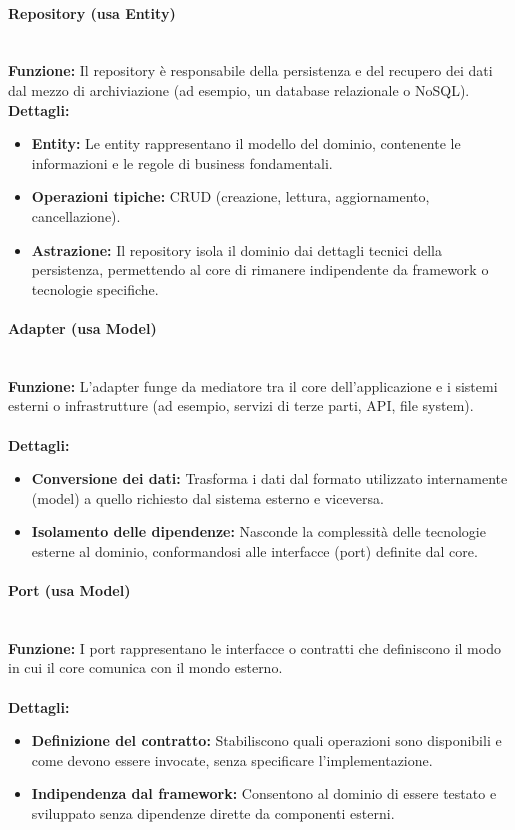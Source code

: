 \paragraph{Repository (usa Entity)} 
\mbox{}\\
\textbf{Funzione:} Il repository è responsabile della persistenza e del recupero dei dati dal mezzo di archiviazione (ad esempio, un database relazionale o NoSQL). 
\mbox{}\\
\textbf{Dettagli:}
\begin{itemize}
  \item \textbf{Entity:} Le entity rappresentano il modello del dominio, contenente le informazioni e le regole di business fondamentali.
  \item \textbf{Operazioni tipiche:} CRUD (creazione, lettura, aggiornamento, cancellazione).
  \item \textbf{Astrazione:} Il repository isola il dominio dai dettagli tecnici della persistenza, permettendo al core di rimanere indipendente da framework o tecnologie specifiche.
\end{itemize}

\paragraph{Adapter (usa Model)}
\mbox{}\\
\textbf{Funzione:} L’adapter funge da mediatore tra il core dell’applicazione e i sistemi esterni o infrastrutture (ad esempio, servizi di terze parti, API, file system). \\
\mbox{}\\
\textbf{Dettagli:}
\begin{itemize}
  \item \textbf{Conversione dei dati:} Trasforma i dati dal formato utilizzato internamente (model) a quello richiesto dal sistema esterno e viceversa.
  \item \textbf{Isolamento delle dipendenze:} Nasconde la complessità delle tecnologie esterne al dominio, conformandosi alle interfacce (port) definite dal core.
\end{itemize}

\paragraph{Port (usa Model)}
\mbox{}\\
\textbf{Funzione:} I port rappresentano le interfacce o contratti che definiscono il modo in cui il core comunica con il mondo esterno. \\
\mbox{}\\
\textbf{Dettagli:}
\begin{itemize}
  \item \textbf{Definizione del contratto:} Stabiliscono quali operazioni sono disponibili e come devono essere invocate, senza specificare l’implementazione.
  \item \textbf{Indipendenza dal framework:} Consentono al dominio di essere testato e sviluppato senza dipendenze dirette da componenti esterni.
\end{itemize}

